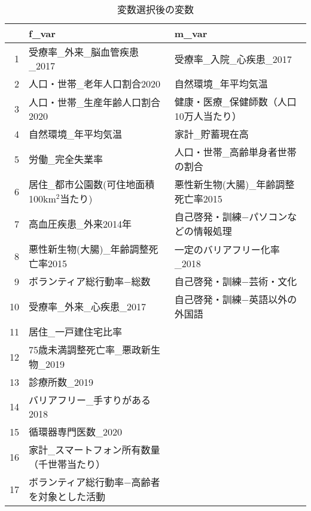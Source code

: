 \begin{table}[H]
\centering
\caption{変数選択後の変数}
\label{UsedVariable}
\begingroup\tiny

\begin{adjustbox}{width=1\textwidth}
\begin{tabular}{rll}
  \hline
 & f\_var & m\_var \\
  \hline
1 & 受療率\_外来\_脳血管疾患\_2017 & 受療率\_入院\_心疾患\_2017 \\
  2 & 人口・世帯\_老年人口割合2020 & 自然環境\_年平均気温 \\
  3 & 人口・世帯\_生産年齢人口割合2020 & 健康・医療\_保健師数（人口10万人当たり） \\
  4 & 自然環境\_年平均気温 & 家計\_貯蓄現在高 \\
  5 & 労働\_完全失業率 & 人口・世帯\_高齢単身者世帯の割合 \\
  6 & 居住\_都市公園数(可住地面積100km$^2$当たり) & 悪性新生物(大腸)\_年齢調整死亡率2015 \\
  7 & 高血圧疾患\_外来2014年 & 自己啓発・訓練−パソコンなどの情報処理 \\
  8 & 悪性新生物(大腸)\_年齢調整死亡率2015 & 一定のバリアフリー化率\_2018 \\
  9 & ボランティア総行動率−総数 & 自己啓発・訓練−芸術・文化 \\
  10 & 受療率\_外来\_心疾患\_2017 & 自己啓発・訓練−英語以外の外国語 \\
  11 & 居住\_一戸建住宅比率 &  \\
  12 & 75歳未満調整死亡率\_悪政新生物\_2019 &  \\
  13 & 診療所数\_2019 &  \\
  14 & バリアフリー\_手すりがある2018 &  \\
  15 & 循環器専門医数\_2020 &  \\
  16 & 家計\_スマートフォン所有数量（千世帯当たり） &  \\
  17 & ボランティア総行動率−高齢者を対象とした活動 &  \\
   \hline
\end{tabular}
\end{adjustbox}

\endgroup
\end{table}
